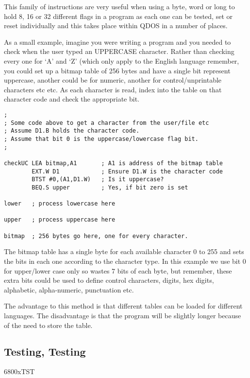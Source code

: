 This family of instructions are very useful when using a byte,
      word or long to hold 8, 16 or 32 different flags in a program as each
      one can be tested, set or reset individually and this takes place within
      QDOS in a number of places.

As a small example, imagine you were writing a program and you
      needed to check when the user typed an UPPERCASE character. Rather than
      checking every one for `A' and `Z' (which only apply to the English
      language remember, you could set up a bitmap table of 256 bytes and have
      a single bit represent uppercase, another could be for numeric, another
      for control/unprintable characters etc etc. As each character is read,
      index into the table on that character code and check the appropriate
      bit.

\begin{lstlisting}[firstnumber=1,caption={Uppercase Check Example},label={lst:Uppercase Check Example}]
;
; Some code above to get a character from the user/file etc
; Assume D1.B holds the character code.
; Assume that bit 0 is the uppercase/lowercase flag bit.
;

checkUC LEA bitmap,A1       ; A1 is address of the bitmap table
        EXT.W D1            ; Ensure D1.W is the character code
        BTST #0,(A1,D1.W)   ; Is it uppercase?
        BEQ.S upper         ; Yes, if bit zero is set

lower   ; process lowercase here

upper   ; process uppercase here

bitmap  ; 256 bytes go here, one for every character.
\end{lstlisting}

The bitmap table has a single byte for each available character 0
      to 255 and sets the bits in each one according to the character type. In
      this example we use bit 0 for upper/lower case only so wastes 7 bits of
      each byte, but remember, these extra bits could be used to define
      control characters, digits, hex digits, alphabetic, alpha-{}numeric,
      punctuation etc.

The advantage to this method is that different tables can be
      loaded for different languages. The disadvantage is that the program
      will be slightly longer because of the need to store the table.

\subsection{Testing, Testing}\mc6800x{TST}
\label{ch5-testing}%

